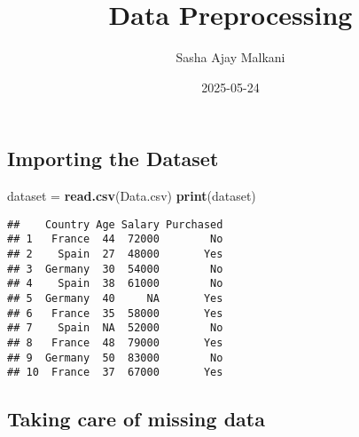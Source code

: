 \documentclass[
]{article}
\title{Data Preprocessing}
\author{Sasha Ajay Malkani}
\date{2025-05-24}
\newenvironment{Shaded}{\begin{snugshade}}{\end{snugshade}}
\newcommand{\AttributeTok}[1]{\textcolor[rgb]{0.13,0.29,0.53}{#1}}
\newcommand{\ConstantTok}[1]{\textcolor[rgb]{0.56,0.35,0.01}{#1}}
\newcommand{\ControlFlowTok}[1]{\textcolor[rgb]{0.13,0.29,0.53}{\textbf{#1}}}
\newcommand{\FunctionTok}[1]{\textcolor[rgb]{0.13,0.29,0.53}{\textbf{#1}}}
\newcommand{\NormalTok}[1]{#1}
\newcommand{\OtherTok}[1]{\textcolor[rgb]{0.56,0.35,0.01}{#1}}
\newcommand{\SpecialCharTok}[1]{\textcolor[rgb]{0.81,0.36,0.00}{\textbf{#1}}}
\newcommand{\StringTok}[1]{\textcolor[rgb]{0.31,0.60,0.02}{#1}}
\begin{document}
\maketitle

\hypertarget{importing-the-dataset}{%
\subsection{Importing the Dataset}\label{importing-the-dataset}}

\begin{Shaded}
\begin{Highlighting}[]
\NormalTok{dataset }\OtherTok{=} \FunctionTok{read.csv}\NormalTok{(}\StringTok{\textquotesingle{}Data.csv\textquotesingle{}}\NormalTok{)}
\FunctionTok{print}\NormalTok{(dataset)}
\end{Highlighting}
\end{Shaded}

\begin{verbatim}
##    Country Age Salary Purchased
## 1   France  44  72000        No
## 2    Spain  27  48000       Yes
## 3  Germany  30  54000        No
## 4    Spain  38  61000        No
## 5  Germany  40     NA       Yes
## 6   France  35  58000       Yes
## 7    Spain  NA  52000        No
## 8   France  48  79000       Yes
## 9  Germany  50  83000        No
## 10  France  37  67000       Yes
\end{verbatim}

\hypertarget{taking-care-of-missing-data}{%
\subsection{Taking care of missing
data}\label{taking-care-of-missing-data}}

\begin{Shaded}
\end{Shaded}
\end{document}
